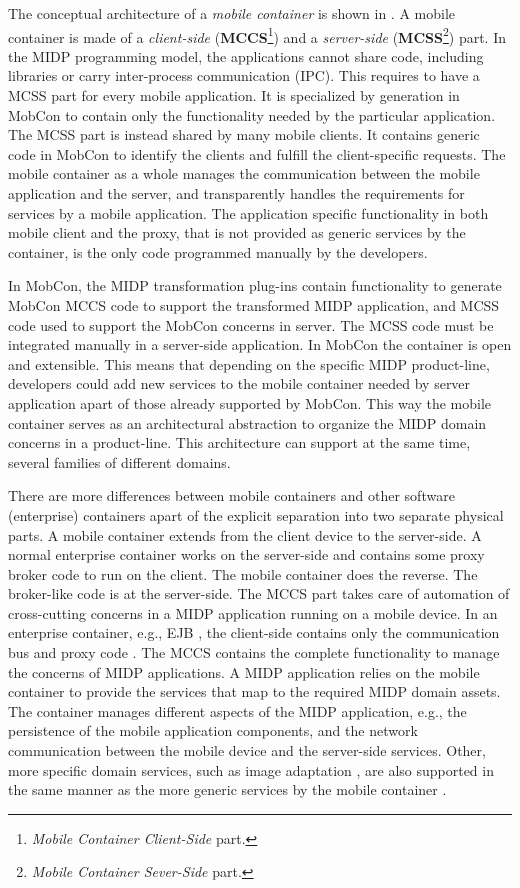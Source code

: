 The conceptual architecture of a \textit{mobile container} is shown in . A mobile container is made of a \textit{client-side} (\textbf{MCCS}\footnote{\textit{Mobile Container Client-Side} part.}) and a \textit{server-side} (\textbf{MCSS}\footnote{\textit{Mobile Container Sever-Side} part.}) part. In the MIDP programming model, the applications cannot share code, including libraries or carry inter-process communication (IPC). This requires to have a MCSS part for every mobile application. It is specialized by generation in MobCon to contain only the functionality needed by the particular application. The MCSS part is instead shared by many mobile clients. It contains generic code in MobCon to identify the clients and fulfill the client-specific requests. The mobile container as a whole manages the communication between the mobile application and the server, and transparently handles the requirements for services by a mobile application. The application specific functionality in both mobile client and the proxy, that is not provided as generic services by the container, is the only code programmed manually by the developers. 

In MobCon, the MIDP transformation plug-ins contain functionality to generate MobCon MCCS code to support the transformed MIDP application, and MCSS code used to support the MobCon concerns in server. The MCSS code must be integrated manually in a server-side application. In MobCon the container is open and extensible. This means that depending on the specific MIDP product-line, developers could add new services to the mobile container needed by server application apart of those already supported by MobCon. This way the mobile container serves as an architectural abstraction  to organize the MIDP domain concerns in a product-line. This architecture can support at the same time, several families of different domains.

There are more differences between mobile containers and other software (enterprise) containers apart of the explicit separation into two separate physical parts. A mobile container extends from the client device to the server-side. A normal enterprise container works on the server-side and contains some proxy broker code to run on the client. The mobile container does the reverse. The broker-like code is at the server-side. The MCCS part takes care of automation of cross-cutting concerns in a MIDP application running on a mobile device. In an enterprise container, e.g., EJB \cite{ejb21}, the client-side contains only the communication bus and proxy code \cite{server.patterns.02}. The MCCS contains the complete functionality to manage the concerns of MIDP applications. A MIDP application relies on the mobile container to provide the services that map to the required MIDP domain assets. The container manages different aspects of the MIDP application, e.g., the persistence of the mobile application components, and the network communication between the mobile device and the server-side services. Other, more specific domain services, such as image adaptation , are also supported in the same manner as the more generic services by the mobile container .

